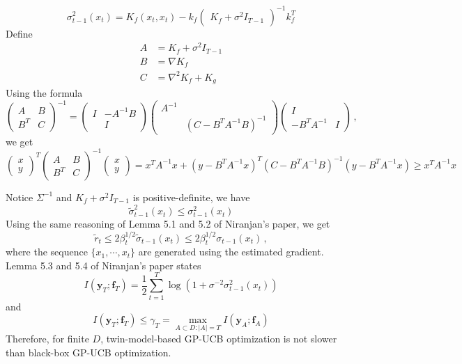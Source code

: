 \documentclass[a4paper,onecolumn]{article}
\begin{document}
$$
    \sigma^2_{t-1}(x_t) = K_f(x_t, x_t) - 
    k_f 
    \begin{pmatrix}
        K_f + \sigma^2 I_{T-1} 
    \end{pmatrix}^{-1}
    k_f^T
$$
Define 
\begin{equation*}\begin{split}
    A &= K_f + \sigma^2 I_{T-1}\\
    B &= \nabla K_f\\
    C &= \nabla^2 K_f + K_g
\end{split}\end{equation*}
Using the formula
\begin{equation*}
    \begin{pmatrix}
        A & B\\
        B^T & C
    \end{pmatrix} ^{-1}
    = 
    \begin{pmatrix}
        I & - A^{-1} B\\
          & I
    \end{pmatrix}
    \begin{pmatrix}
        A^{-1}  & \\
        & \left(C-B^{T}A^{-1}B\right)^{-1}
    \end{pmatrix}
    \begin{pmatrix}
        I &\\
        -B^TA^{-1} & I
    \end{pmatrix}\,,
\end{equation*}
we get
\begin{equation*}
    \begin{pmatrix}
        x\\ y
    \end{pmatrix}^{T}
    \begin{pmatrix}
        A& B\\
        B^T & C
    \end{pmatrix}^{-1}
    \begin{pmatrix}
        x\\y
    \end{pmatrix}
    = x^T A^{-1} x + \left(y-B^TA^{-1}x\right)^{T}
    \left(C-B^T A^{-1}B\right)^{-1} \left(y-B^T A^{-1}x\right)
    \ge x^T A^{-1} x 
\end{equation*}

\noindent Notice $\Sigma^{-1}$ and $K_f+\sigma^2 I_{T-1}$ is positive-definite, we have
$$
    \tilde{\sigma}^2_{t-1}(x_t) \le \sigma^2_{t-1}(x_t)
$$
Using the same reasoning of Lemma 5.1 and 5.2 of Niranjan's paper, we get
$$
    \tilde{r}_t \le 2 \beta_t^{1/2} \tilde{\sigma}_{t-1}(x_t) \le 2 \beta_t^{1/2} {\sigma}_{t-1}(x_t)\,,
$$
where the sequence $\{x_1,\cdots, x_t\}$ are generated using the estimated gradient.\\
Lemma 5.3 and 5.4 of Niranjan's paper states
$$
    I(\textbf{y}_T; \textbf{f}_T) = \frac{1}{2}\sum_{t=1}^T \log\left( 1+\sigma^{-2}\sigma^{2}_{t-1} (x_t) \right)
$$
and
$$
    I(\textbf{y}_T; \textbf{f}_T) \le \gamma_T = \max_{A\subset D: |A|=T} I(\textbf{y}_A; \textbf{f}_A)
$$
Therefore, for finite $D$, twin-model-based GP-UCB optimization is not slower than black-box GP-UCB optimization.
\end{document}
